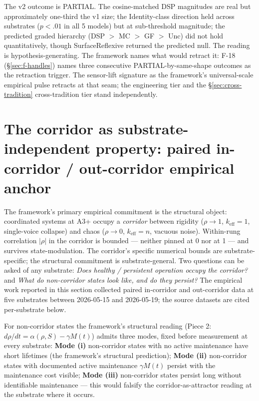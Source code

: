 \documentclass[11pt,a4paper]{article}
\newcommand{\keff}{k_{\text{eff}}}
\begin{document}
The v2 outcome is PARTIAL. The cosine-matched DSP magnitudes are real but approximately one-third the v1 size; the Identity-class direction held across substrates ($p < .01$ in all 5 models) but at sub-threshold magnitude; the predicted graded hierarchy (DSP $>$ MC $>$ GF $>$ Unc) did not hold quantitatively, though SurfaceReflexive returned the predicted null. The reading is hypothesis-generating. The framework names what would retract it: F-18 (\S\ref{sec:f-handles}) names three consecutive PARTIAL-by-same-shape outcomes as the retraction trigger. The sensor-lift signature as the framework's universal-scale empirical pulse retracts at that seam; the engineering tier and the \S\ref{sec:cross-tradition} cross-tradition tier stand independently.

\section{The corridor as substrate-independent property: paired in-corridor / out-corridor empirical anchor}\label{sec:corridor-empirical}

The framework's primary empirical commitment is the structural object: coordinated systems at A3+ occupy a \emph{corridor} between rigidity ($\rho \to 1$, $\keff = 1$, single-voice collapse) and chaos ($\rho \to 0$, $\keff = n$, vacuous noise). Within-rung correlation $|\rho|$ in the corridor is bounded --- neither pinned at 0 nor at 1 --- and survives state-modulation. The corridor's specific numerical bounds are substrate-specific; the structural commitment is substrate-general. Two questions can be asked of any substrate: \emph{Does healthy / persistent operation occupy the corridor?} and \emph{What do non-corridor states look like, and do they persist?} The empirical work reported in this section collected paired in-corridor and out-corridor data at five substrates between 2026-05-15 and 2026-05-19; the source datasets are cited per-substrate below.

For non-corridor states the framework's structural reading (Piece 2: $d\rho/dt = \alpha(\rho, S) - \gamma M(t)$) admits three modes, fixed before measurement at every substrate: \textbf{Mode (i)} non-corridor states with no active maintenance have short lifetimes (the framework's structural prediction); \textbf{Mode (ii)} non-corridor states with documented active maintenance $\gamma M(t)$ persist with the maintenance cost visible; \textbf{Mode (iii)} non-corridor states persist long without identifiable maintenance --- this would falsify the corridor-as-attractor reading at the substrate where it occurs.
\end{document}
